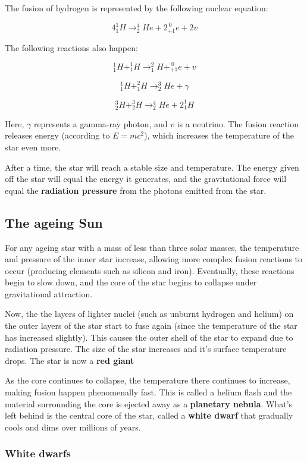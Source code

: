 \documentclass{article}
\begin{document}
The fusion of hydrogen is represented by the following nuclear equation:

\[
	4^1_1H \rightarrow ^4_2He + 2^{~0}_{+1}e + 2v
\]

The following reactions also happen:

\[
	^1_1H + ^1_1H \rightarrow ^2_1H + ^{~0}_{+1}e + v
\]

\[
	^1_1H + ^2_1H \rightarrow ^3_2He + \gamma
\]

\[
	^3_2H + ^3_2H \rightarrow ^4_2He + 2^{1}_{1}H
\]

Here, $\gamma$ represents a gamma-ray photon, and $v$ is a neutrino. The fusion
reaction releases energy (according to $E=mc^2$), which increases the
temperature of the star even more.

After a time, the star will reach a stable size and temperature. The energy
given off the star will equal the energy it generates, and the gravitational
force will equal the {\bf radiation pressure} from the photons emitted from the
star.

\subsection{The ageing Sun}

For any ageing star with a mass of less than three solar masses, the temperature
and pressure of the inner star increase, allowing more complex fusion reactions
to occur (producing elements such as silicon and iron). Eventually, these
reactions begin to slow down, and the core of the star begins to collapse under
gravitational attraction.

Now, the the layers of lighter nuclei (such as unburnt hydrogen and helium) on
the outer layers of the star start to fuse again (since the temperature of the
star has increased slightly). This causes the outer shell of the star to expand
due to radiation pressure. The size of the star increases and it's surface
temperature drops. The star is now a {\bf red giant}

As the core continues to collapse, the temperature there continues to increase,
making fusion happen phenomenally fast. This is called a helium flash and the
material surrounding the core is ejected away as a {\bf planetary
nebula}.
What's left behind is the central core of the star, called a {\bf white dwarf}
that gradually cools and dims over millions of years.

\subsubsection{White dwarfs}
\end{document}
